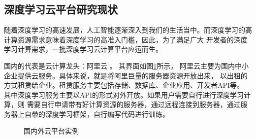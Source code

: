 \subsection{深度学习云平台研究现状}
随着深度学习的高速发展，人工智能逐渐深入到我们的生活当中。而深度学习的高计算资源需求意味着深度学习的高准入门槛，因此，为了满足广大
开发者的深度学习计算需求，一批深度学习云计算平台应运而生。

国内的代表是云计算龙头：阿里云  \cite{aliyun}。
其界面如图\ref{fig:cloud_platform}所示，
阿里云主要为国内中小企业提供云服务。具体来说，就是将阿里巨量的服务器资源开放出来，
以出租的方式租赁给企业。租赁服务主要包括存储、数据库、企业应用、开发者API等。
其中深度学习服务主要以API的形式对外开放。如果用户需要自行进行深度学习计算，则
需要自行申请带有好计算资源的服务器，通过远程连接到服务器，通过服务器上自带的深度学习框架，自行编写代码进行训练。

\begin{figure}[h]
    \centering
    \caption{国内外云平台实例}
    \label{fig:cloud_platform}
\end{figure}


